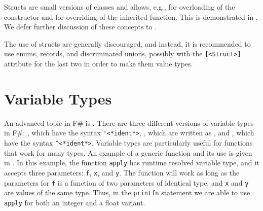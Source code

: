 Structs are small versions of classes and allows, e.g., for overloading of the  constructor and for overriding of the inherited  function. This is demonstrated in .
%
%
We defer further discussion of these concepts to .

The use of structs are generally discouraged, and instead, it is recommended to use enums, records, and discriminated unions, possibly with the \lstinline{[<Struct>]} attribute for the last two in order to make them value types.

\section{Variable Types}
\label{sec:variableTypes}
An advanced topic in F\# is . There are three different versions of variable types in F\#: , which have the syntax \lstinline[language=syntax]{'<*ident*>}, , which are written as \idx[_@\lstinline{_}]{\lexeme{_}}, and , which have the syntax \lstinline[language=syntax]{^<*ident*>}. Variable types are particularly useful for functions that work for many types.  An example of a generic function and its use is given in .
%
%
In this example, the function \lstinline{apply} has runtime resolved variable type, and it accepts three parameters: \lstinline{f}, \lstinline{x}, and \lstinline{y}. The function will work as long as the parameters for \lstinline{f} is a function of two parameters of identical type, and \lstinline{x} and \lstinline{y} are values of the same type. Thus, in the \lstinline{printfn} statement we are able to use \lstinline{apply} for both an integer and a float variant.

